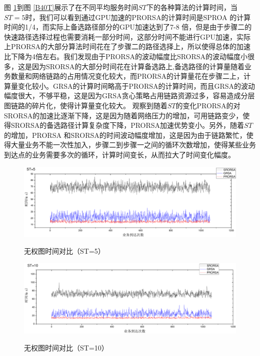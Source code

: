 图 \ref{B5T}到图 \ref{B40T}展示了在不同平均服务时间$ST$下的各种算法的计算时间，当$ST=5$时，我们可以看到通过GPU加速的PRORSA的计算时间是SPROA 的计算时间的1/4，而实际上备选路径部分的GPU加速达到了7-8 倍，但是由于步骤二的快速路径选择过程也需要消耗一部分时间，这部分时间不能进行GPU加速，实际上PRORSA的大部分算法时间花在了步骤二的路径选择上，所以使得总体的加速比下降为4倍左右。我们发现由于PRORSA的波动幅度比SRORSA的波动幅度小很多，这是因为SRORSA的大部分时间花在计算备选路上,备选路径的计算量随着业务数量和网络链路的占用情况变化较大，而PRORSA的计算量花在步骤二上，计算量变化较小。GRSA的计算时间略高于PRORSA的计算时间，而且GRSA的波动幅度很大，不够平稳，这是因为GRSA贪心策略占用链路资源过多，容易造成分层图链路的碎片化，使得计算量变化较大。
观察到随着$ST$的变化PRORSA的对SRORSA的加速比逐渐下降，这是因为随着网络压力的增加，可用链路变少，使得SRORSA的备选路径计算复杂度下降，PRORSA加速优势变小。另外，随着$ST$的增加，PRORSA 和SRORSA的时间波动幅度增加，这是因为由于链路繁忙，使得大量业务不能一次性加入，步骤二到步骤一之间的循环次数增加，使得某些业务到达点的业务需要多次的循环，计算时间变长，从而拉大了时间变化幅度。
\begin{figure}
\setlength{\belowcaptionskip}{-0.5cm}
\begin{center}
{\includegraphics[width=1 \textwidth]{figures/B5T.pdf}}
\end{center}
\caption{{\footnotesize{无权图时间对比（ST=5）}}}
\label{B5T}
\end{figure}
\begin{figure}
\setlength{\belowcaptionskip}{-0.5cm}
\begin{center}
{\includegraphics[width=1 \textwidth]{figures/B10T.pdf}}
\end{center}
\caption{{\footnotesize{无权图时间对比（ST=10）}}}
\label{B10T}
\end{figure}
